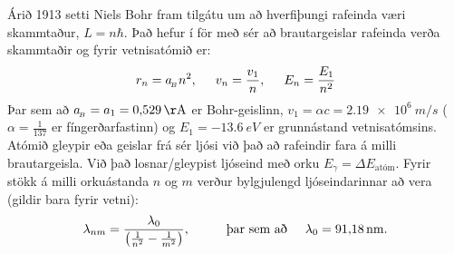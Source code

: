 \begin{tcolorbox}
Árið 1913 setti Niels Bohr fram tilgátu um að hverfiþungi rafeinda væri skammtaður, $L = n\hbar$. Það hefur í för með sér að brautargeislar rafeinda verða skammtaðir og fyrir vetnisatómið er:
\begin{align*}
    r_n = a_{\!_B}n^2, \hspace{0.5cm} v_n = \frac{v_1}{n}, \hspace{0.5cm} E_n = \frac{E_1}{n^2}
\end{align*}
Þar sem að $a_{\!_B} = a_1 = \SI{0.529}{\AA}$ er Bohr-geislinn, $v_1 = \alpha c = \SI{2.19e6}{m/s}$ ($\alpha = \frac{1}{137}$ er fíngerðarfastinn) og $E_1 = \SI{-13.6}{eV}$ er grunnástand vetnisatómsins. Atómið gleypir eða geislar frá sér ljósi við það að rafeindir fara á milli brautargeisla. Við það losnar/gleypist ljóseind með orku $E_\gamma = \Delta E_{\text{atóm}}$. Fyrir stökk á milli orkuástanda $n$ og $m$ verður bylgjulengd ljóseindarinnar að vera (gildir bara fyrir vetni):
\begin{align*}
    \lambda_{nm} = \frac{\lambda_0}{\left( \frac{1}{n^2} - \frac{1}{m^2}\right)}, \hspace{1cm} \text{þar sem að} \hspace{0.5cm} \lambda_0 = \SI{91.18}{nm}.
\end{align*}
\end{tcolorbox}

